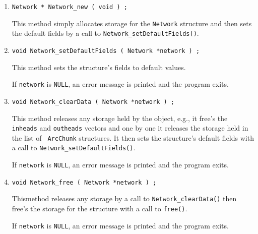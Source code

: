 \begin{enumerate}
\item
\begin{verbatim}
Network * Network_new ( void ) ;
\end{verbatim}
This method simply allocates storage for the {\tt Network} structure 
and then sets the default fields by a call to 
{\tt Network\_setDefaultFields()}.
\item
\begin{verbatim}
void Network_setDefaultFields ( Network *network ) ;
\end{verbatim}
This method sets the structure's fields to default values.
\par {}
If {\tt network} is {\tt NULL},
an error message is printed and the program exits.
\item
\begin{verbatim}
void Network_clearData ( Network *network ) ;
\end{verbatim}
This method releases any storage held by the object,
e.g., it free's the {\tt inheads} and {\tt outheads} vectors
and one by one it releases the storage held in the list of {\tt
ArcChunk} structures.
It then sets the structure's default fields 
with a call to {\tt Network\_setDefaultFields()}.
\par {}
If {\tt network} is {\tt NULL},
an error message is printed and the program exits.
\item
\begin{verbatim}
void Network_free ( Network *network ) ;
\end{verbatim}
Thismethod releases any storage by a call to 
{\tt Network\_clearData()} then free's the storage for the 
structure with a call to {\tt free()}.
\par {}
If {\tt network} is {\tt NULL},
an error message is printed and the program exits.
\end{enumerate}
\par
